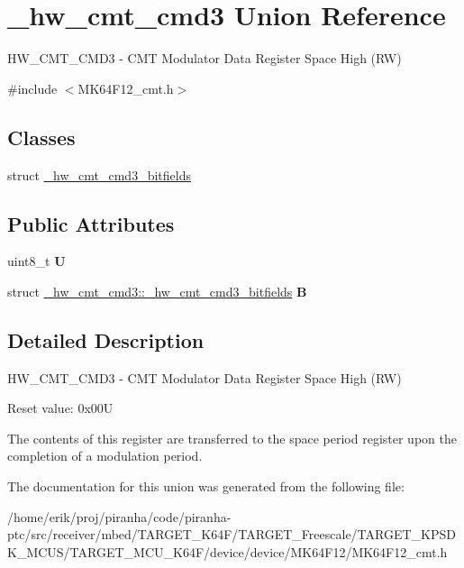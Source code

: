 \hypertarget{union__hw__cmt__cmd3}{}\section{\+\_\+hw\+\_\+cmt\+\_\+cmd3 Union Reference}
\label{union__hw__cmt__cmd3}


H\+W\+\_\+\+C\+M\+T\+\_\+\+C\+M\+D3 -\/ C\+MT Modulator Data Register Space High (RW)  




{\ttfamily \#include $<$M\+K64\+F12\+\_\+cmt.\+h$>$}

\subsection*{Classes}
\begin{DoxyCompactItemize}
\item 
struct \hyperlink{struct__hw__cmt__cmd3_1_1__hw__cmt__cmd3__bitfields}{\+\_\+hw\+\_\+cmt\+\_\+cmd3\+\_\+bitfields}
\end{DoxyCompactItemize}
\subsection*{Public Attributes}
\begin{DoxyCompactItemize}
\item 
uint8\+\_\+t {\bfseries U}\hypertarget{union__hw__cmt__cmd3_a59709c532b0dc548cd96bc7148cf16b9}{}\label{union__hw__cmt__cmd3_a59709c532b0dc548cd96bc7148cf16b9}

\item 
struct \hyperlink{struct__hw__cmt__cmd3_1_1__hw__cmt__cmd3__bitfields}{\+\_\+hw\+\_\+cmt\+\_\+cmd3\+::\+\_\+hw\+\_\+cmt\+\_\+cmd3\+\_\+bitfields} {\bfseries B}\hypertarget{union__hw__cmt__cmd3_acfacb35b814f93513af97f5e7c3154ab}{}\label{union__hw__cmt__cmd3_acfacb35b814f93513af97f5e7c3154ab}

\end{DoxyCompactItemize}


\subsection{Detailed Description}
H\+W\+\_\+\+C\+M\+T\+\_\+\+C\+M\+D3 -\/ C\+MT Modulator Data Register Space High (RW) 

Reset value\+: 0x00U

The contents of this register are transferred to the space period register upon the completion of a modulation period. 

The documentation for this union was generated from the following file\+:\begin{DoxyCompactItemize}
\item 
/home/erik/proj/piranha/code/piranha-\/ptc/src/receiver/mbed/\+T\+A\+R\+G\+E\+T\+\_\+\+K64\+F/\+T\+A\+R\+G\+E\+T\+\_\+\+Freescale/\+T\+A\+R\+G\+E\+T\+\_\+\+K\+P\+S\+D\+K\+\_\+\+M\+C\+U\+S/\+T\+A\+R\+G\+E\+T\+\_\+\+M\+C\+U\+\_\+\+K64\+F/device/device/\+M\+K64\+F12/M\+K64\+F12\+\_\+cmt.\+h\end{DoxyCompactItemize}
